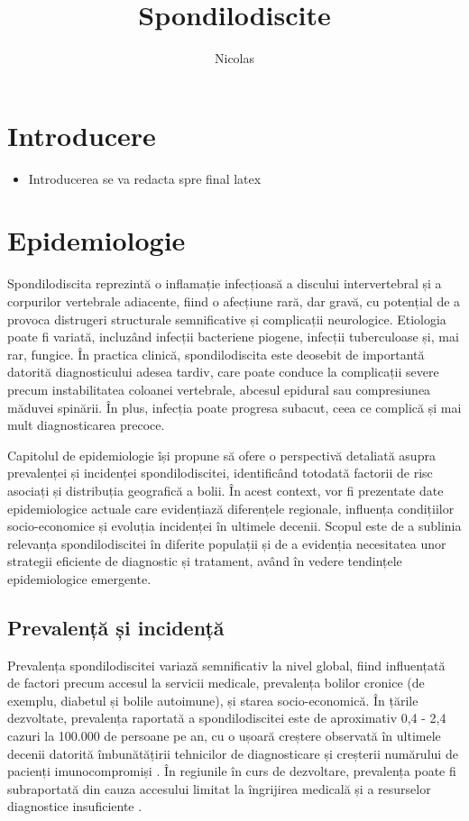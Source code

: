 \message{ !name(LaMain.tex)}\documentclass[romanian,12pt,a4paper]{article}
\title{Spondilodiscite}
\author{Nicolas}
\date{}
\begin{document}


	\maketitle

\pagebreak
\section{Introducere}

\begin{itemize}
\item
  Introducerea se va redacta spre final latex
\end{itemize}
\pagebreak
\section{Epidemiologie}

Spondilodiscita reprezintă o inflamație infecțioasă a discului
intervertebral și a corpurilor vertebrale adiacente, fiind o afecțiune
rară, dar gravă, cu potențial de a provoca distrugeri structurale
semnificative și complicații neurologice. Etiologia poate fi variată,
incluzând infecții bacteriene piogene, infecții tuberculoase și, mai
rar, fungice. În practica clinică, spondilodiscita este
deosebit de importantă datorită diagnosticului adesea tardiv, care poate
conduce la complicații severe precum instabilitatea coloanei vertebrale,
abcesul epidural sau compresiunea măduvei spinării. În plus, infecția
poate progresa subacut, ceea ce complică și mai mult diagnosticarea
precoce.

Capitolul de epidemiologie își propune să ofere o perspectivă detaliată
asupra prevalenței și incidenței spondilodiscitei, identificând totodată
factorii de risc asociați și distribuția geografică a bolii. În acest
context, vor fi prezentate date epidemiologice actuale care evidențiază
diferențele regionale, influența condițiilor socio-economice și evoluția
incidenței în ultimele decenii. Scopul este de a sublinia relevanța
spondilodiscitei în diferite populații și de a evidenția necesitatea
unor strategii eficiente de diagnostic și tratament, având în vedere
tendințele epidemiologice emergente.

\subsection{Prevalență și incidență}

Prevalența spondilodiscitei variază semnificativ la nivel global, fiind
influențată de factori precum accesul la servicii medicale, prevalența
bolilor cronice (de exemplu, diabetul și bolile autoimune), și starea
socio-economică. În țările dezvoltate, prevalența raportată a
spondilodiscitei este de aproximativ 0,4 - 2,4 cazuri la 100.000 de
persoane pe an, cu o ușoară creștere observată în ultimele decenii
datorită îmbunătățirii tehnicilor de diagnosticare și creșterii
numărului de pacienți imunocompromiși \cite{RoleNuclearMedicine2012}. În
regiunile în curs de dezvoltare, prevalența poate fi subraportată din
cauza accesului limitat la îngrijirea medicală și a resurselor
diagnostice insuficiente \cite{RadionuclideImagingMusculoskeletal2016}.
\end{document}
